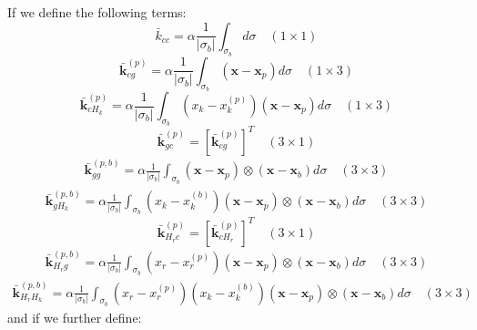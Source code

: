 \documentclass[11pt]{article} %
\begin{document}
If we define the following terms:
\begin{equation}
	\bar{k}_{cc} = \alpha \frac{1}{| \sigma_b |} \int_{\sigma_b} d \sigma \quad (1 \times 1)
\end{equation}
\begin{equation}
	\bar{\mathbf{k}}_{cg}^{(p)} = \alpha \frac{1}{| \sigma_b |} \int_{\sigma_b} (\mathbf{x} - \mathbf{x}_p) d \sigma \quad (1 \times 3)
\end{equation}
\begin{equation}
	\bar{\mathbf{k}}_{cH_k}^{(p)} = \alpha \frac{1}{| \sigma_b |} \int_{\sigma_b} (x_k - x^{(p)}_k)  (\mathbf{x} - \mathbf{x}_p) d \sigma \quad (1 \times 3)
\end{equation}
\begin{equation}
	\bar{\mathbf{k}}_{gc}^{(p)} = \left[ \bar{\mathbf{k}}_{cg}^{(p)} \right]^T \quad (3 \times 1)
\end{equation}
\begin{eqnarray}
	\bar{\mathbf{k}}_{gg}^{(p,b)} = \alpha \frac{1}{| \sigma_b |} \int_{\sigma_b} (\mathbf{x} - \mathbf{x}_p) \otimes (\mathbf{x} - \mathbf{x}_b) d \sigma \quad (3 \times 3)
\end{eqnarray}
\begin{eqnarray}
	\bar{\mathbf{k}}_{gH_k}^{(p,b)} = \alpha \frac{1}{| \sigma_b |} \int_{\sigma_b} (x_k - x^{(b)}_k) (\mathbf{x} - \mathbf{x}_p) \otimes (\mathbf{x} - \mathbf{x}_b) d \sigma \quad (3 \times 3)
\end{eqnarray}
\begin{equation}
	\bar{\mathbf{k}}_{H_rc}^{(p)} = \left[ \bar{\mathbf{k}}_{cH_r}^{(p)} \right]^T \quad (3 \times 1)
\end{equation}
\begin{eqnarray}
	\bar{\mathbf{k}}_{H_rg}^{(p,b)} = \alpha \frac{1}{| \sigma_b |} \int_{\sigma_b} (x_r - x^{(p)}_r) (\mathbf{x} - \mathbf{x}_p) \otimes (\mathbf{x} - \mathbf{x}_b) d \sigma \quad (3 \times 3)
\end{eqnarray}
\begin{eqnarray}
	\bar{\mathbf{k}}_{H_rH_k}^{(p,b)} = \alpha \frac{1}{| \sigma_b |} \int_{\sigma_b} (x_r - x^{(p)}_r) (x_k - x^{(b)}_k) (\mathbf{x} - \mathbf{x}_p) \otimes (\mathbf{x} - \mathbf{x}_b) d \sigma \quad (3 \times 3)
\end{eqnarray}
and if we further define:
\end{document}

